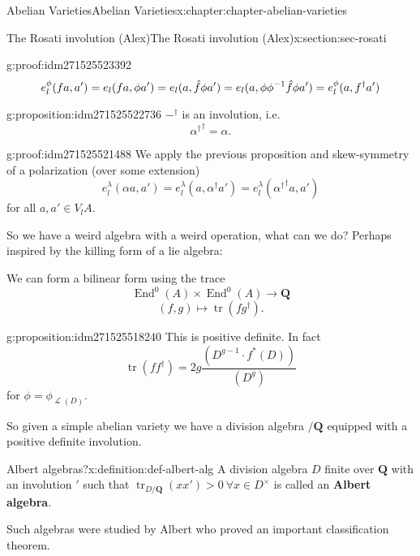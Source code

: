 \documentclass[oneside,10pt,]{book}
\newcommand{\terminology}[1]{\textbf{#1}}
\newcommand{\qedhere}{\relax}
\numberwithin{equation}{section}
\newcommand{\sheaf}[1]{\operatorname{\mathcal{#1}}}
\newcommand{\inv}{^{-1}}
\newcommand{\QQ}{\mathbf{Q}}
\DeclareMathOperator{\End}{End}
\DeclareMathOperator{\tr}{tr}
\begin{document}
\begin{chapterptx}{Abelian Varieties}{}{Abelian Varieties}{}{}{x:chapter:chapter-abelian-varieties}
\begin{sectionptx}{The Rosati involution (Alex)}{}{The Rosati involution (Alex)}{}{}{x:section:sec-rosati}
\begin{proofptx}{}{g:proof:idm271525523392}
%
\begin{equation*}
e_l^\phi(f a ,a')  = e_l(fa, \phi a')= e_l(a, \hat f \phi a') = e_l(a, \phi\phi\inv \hat f \phi a') =  e_l^\phi(a, f^\dagger a')\qedhere
\end{equation*}
%
\end{proofptx}
\begin{proposition}{}{}{g:proposition:idm271525522736}%
\(-^\dagger\) is an involution, i.e.%
\begin{equation*}
{\alpha^\dagger}^{\dagger} = \alpha\text{.}
\end{equation*}
%
\end{proposition}
\begin{proofptx}{}{g:proof:idm271525521488}
We apply the previous proposition and skew-symmetry of a polarization (over some extension)%
\begin{equation*}
e_l^\lambda(\alpha a,a') = e_l^\lambda(a, \alpha^\dagger a') = e_l^\lambda({\alpha^\dagger}^{\dagger} a, a')
\end{equation*}
for all \(a,a'\in V_l A\).%
\end{proofptx}
So we have a weird algebra with a weird operation, what can we do? Perhaps inspired by the killing form of a lie algebra:%
\par
We can form a bilinear form using the trace%
\begin{equation*}
\End^0(A) \times \End^0(A) \to \QQ
\end{equation*}
%
\begin{equation*}
(f,g) \mapsto \tr(fg^\dagger)\text{.}
\end{equation*}
%
\begin{proposition}{}{}{g:proposition:idm271525518240}%
This is positive definite. In fact%
\begin{equation*}
\tr(ff^\dagger) = 2g\frac{(D^{g-1}\cdot f^*(D))}{(D^g)}
\end{equation*}
for \(\phi = \phi_{\sheaf L(D)}\).%
\end{proposition}
So given a simple abelian variety we have a division algebra  \(/ \QQ\) equipped with  a positive definite involution.%
\begin{definition}{Albert algebras?}{x:definition:def-albert-alg}%
A division algebra \(D\) finite over \(\QQ\) with an involution \('\) such that \(\tr_{D/\QQ}(xx') > 0\ \forall x\in D^\times\) is called an \terminology{Albert algebra}.%
\end{definition}
Such algebras were studied by Albert who proved an important classification theorem.%

\end{sectionptx}
\end{chapterptx}
\end{document}
